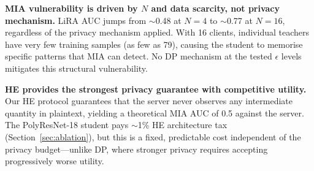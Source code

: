 \textbf{MIA vulnerability is driven by $N$ and data scarcity, not privacy mechanism.} LiRA AUC jumps from ${\sim}$0.48 at $N{=}4$ to ${\sim}$0.77 at $N{=}16$, regardless of the privacy mechanism applied. With 16 clients, individual teachers have very few training samples (as few as 79), causing the student to memorise specific patterns that MIA can detect. No DP mechanism at the tested $\epsilon$ levels mitigates this structural vulnerability.
 
\textbf{HE provides the strongest privacy guarantee with competitive utility.} Our HE protocol guarantees that the server never observes any intermediate quantity in plaintext, yielding a theoretical MIA AUC of 0.5 against the server. The PolyResNet-18 student pays ${\sim}$1\% HE architecture tax (Section~\ref{sec:ablation}), but this is a fixed, predictable cost independent of the privacy budget---unlike DP, where stronger privacy requires accepting progressively worse utility.